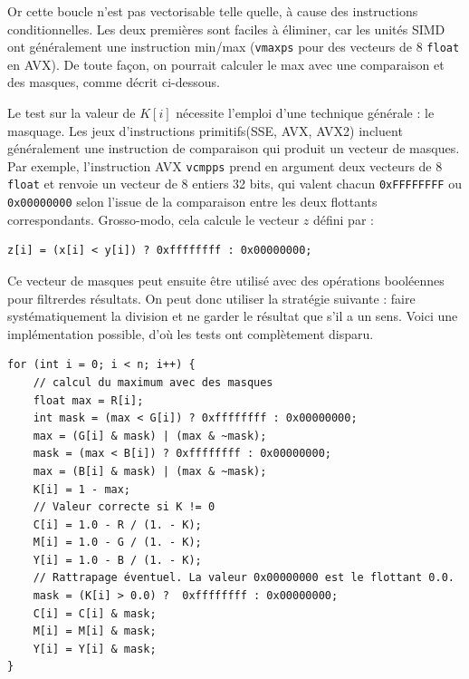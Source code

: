 Or cette boucle n'est pas vectorisable telle quelle, à cause des instructions
conditionnelles. Les deux premières sont faciles à éliminer, car les unités SIMD
ont généralement une instruction min/max (\texttt{vmaxps} pour des vecteurs de 8
\texttt{float} en AVX). De toute façon, on pourrait calculer le max avec une
comparaison et des masques, comme décrit ci-dessous.

Le test sur la valeur de $K[i]$ nécessite l'emploi d'une technique générale : le
masquage. Les jeux d'instructions \og primitifs\fg (SSE, AVX, AVX2) incluent
généralement une instruction de comparaison qui produit un vecteur de
masques. Par exemple, l'instruction AVX \texttt{vcmpps} prend en argument deux
vecteurs de 8 \texttt{float} et renvoie un vecteur de 8 entiers 32 bits, qui
valent chacun \texttt{0xFFFFFFFF} ou \texttt{0x00000000} selon l'issue de la
comparaison entre les deux flottants correspondants. Grosso-modo, cela calcule
le vecteur $z$ défini par :
\begin{verbatim}
z[i] = (x[i] < y[i]) ? 0xffffffff : 0x00000000;
\end{verbatim}
Ce vecteur de masques peut ensuite être utilisé avec des opérations booléennes
pour \og filtrer\fg des résultats. On peut donc utiliser la stratégie suivante :
faire systématiquement la division et ne garder le résultat que s'il a un sens.
Voici une implémentation possible, d'où les tests ont complètement disparu.

\begin{verbatim}
for (int i = 0; i < n; i++) {
    // calcul du maximum avec des masques
    float max = R[i];
    int mask = (max < G[i]) ? 0xffffffff : 0x00000000;
    max = (G[i] & mask) | (max & ~mask);
    mask = (max < B[i]) ? 0xffffffff : 0x00000000;
    max = (B[i] & mask) | (max & ~mask);
    K[i] = 1 - max;
    // Valeur correcte si K != 0
    C[i] = 1.0 - R / (1. - K);
    M[i] = 1.0 - G / (1. - K);
    Y[i] = 1.0 - B / (1. - K);
    // Rattrapage éventuel. La valeur 0x00000000 est le flottant 0.0.
    mask = (K[i] > 0.0) ?  0xffffffff : 0x00000000;
    C[i] = C[i] & mask;
    M[i] = M[i] & mask;
    Y[i] = Y[i] & mask;
}
\end{verbatim}






